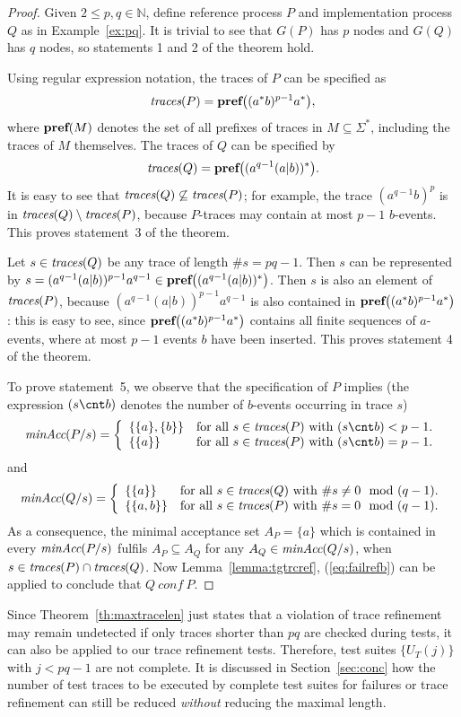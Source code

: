 \begin{proof}
Given $2\le p,q \in\mathbb{N}$, define reference process $P$ and implementation process $Q$ as in Example~\ref{ex:pq}. It is trivial to see that
$G(P)$ has $p$ nodes and $G(Q)$ has $q$ nodes, so statements 1 and 2 of the theorem hold.

Using regular expression notation, the traces of $P$ can be specified as
\[
\text{\it traces}(P) = \text{\bf pref}\big(  (a^*b)^{p-1}a^* \big),
\]
where $\text{\bf pref}(M)$ denotes the set of all prefixes of traces in $M\subseteq\Sigma^*$,
including the traces of $M$ themselves.
The traces of $Q$ can be specified by
\[
\text{\it traces}(Q) = \text{\bf pref}\big( (a^{q-1}(a|b))^*  \big).
\]
It is easy to see that $\text{\it traces}(Q)\not\subseteq\text{\it traces}(P)$; for example, the trace
$(a^{q-1}b)^p$ is in $\text{\it traces}(Q)\setminus\text{\it traces}(P)$, because $P$-traces may contain at most $p-1$ $b$-events. This proves statement~3 of the theorem.

Let $s \in\text{\it traces}(Q)$ be any trace of length $\#s = pq-1$. Then $s$ can be represented
by $s = (a^{q-1}(a|b))^{p-1}a^{q-1} \in \text{\bf pref}\big( (a^{q-1}(a|b))^*  \big)$.
Then $s$ is also an element of $\text{\it traces}(P)$, because $(a^{q-1}(a|b))^{p-1}a^{q-1}$
is also contained in $\text{\bf pref}\big(  (a^*b)^{p-1}a^* \big)$: this is easy to see, since
$\text{\bf pref}\big(  (a^*b)^{p-1}a^* \big)$ contains all finite sequences of $a$-events,
where at most $p-1$ events $b$ have been inserted. This proves statement 4 of the theorem.

To prove statement~5, we observe that the specification of $P$ implies (the
expression $(s\cnt b)$ denotes the number of $b$-events occurring in trace $s$)
\[
\minaccs(P/s) = \left\{
\begin{array}{ll}
\{ \{a\}, \{b\} \} & \text{for all $s\in\trc(P)$ with $(s\cnt b) <p-1$.}
\\
\{ \{a\} \} & \text{for all $s\in\trc(P)$ with $(s\cnt b) = p-1$.}
\end{array}
\right.
\]
and
\[
\text{\it minAcc}(Q/s) = \left\{
\begin{array}{ll}
\{ \{a\}  \} & \text{for all $s\in\text{\it traces}(Q)$ with $\#s \neq 0\mod(q-1)$.}
\\
\{ \{a,b\} \} & \text{for all $s\in\text{\it traces}(P)$ with $\#s = 0\mod(q-1)$.}
\end{array}
\right.
\]
As a  consequence, the minimal acceptance set $A_P = \{a\}$ which is
contained in every $\text{\it minAcc}(P/s)$ fulfils $A_P \subseteq A_Q$ for
any $A_Q\in\text{\it minAcc}(Q/s)$, when $s\in\text{\it traces}(P)\cap \text{\it traces}(Q)$. Now Lemma~\ref{lemma:tgtrcref},
(\ref{eq:failrefb}) can be applied to conclude that $Q\ conf\ P$.
\xbox
\end{proof}
%
Since Theorem~\ref{th:maxtracelen} just states that a violation of trace
refinement may remain undetected if only traces shorter than $pq$ are checked
during tests, it can also be applied to our trace refinement tests.
Therefore, test suites $\{ U_T(j) \}$ with $j<pq-1$ are not complete. It is
discussed in Section~\ref{sec:conc} how the number of test traces to be
executed by complete test suites for failures or trace refinement can still
be reduced {\it without} reducing the maximal length.

